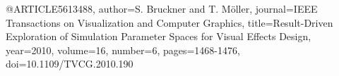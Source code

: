 @ARTICLE{5613488,
  author={S. {Bruckner} and T. {Möller}},
  journal={IEEE Transactions on Visualization and Computer Graphics}, 
  title={Result-Driven Exploration of Simulation Parameter Spaces for Visual Effects Design}, 
  year={2010},
  volume={16},
  number={6},
  pages={1468-1476},
  doi={10.1109/TVCG.2010.190}}